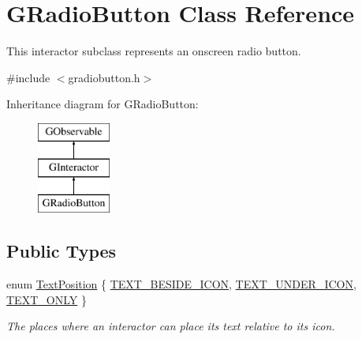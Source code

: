 \hypertarget{classsgl_1_1GRadioButton}{}\section{G\+Radio\+Button Class Reference}
\label{classsgl_1_1GRadioButton}


This interactor subclass represents an onscreen radio button.  




{\ttfamily \#include $<$gradiobutton.\+h$>$}

Inheritance diagram for G\+Radio\+Button\+:\begin{figure}[H]
\begin{center}
\leavevmode
\includegraphics[height=3.000000cm]{classsgl_1_1GRadioButton}
\end{center}
\end{figure}
\subsection*{Public Types}
\begin{DoxyCompactItemize}
\item 
enum \mbox{\hyperlink{classsgl_1_1GInteractor_a8e0d441725a81d2bbdebbea09078260e}{Text\+Position}} \{ \mbox{\hyperlink{classsgl_1_1GInteractor_a8e0d441725a81d2bbdebbea09078260ea4cd6f2e7d5a08d6f4dc052df2358f774}{T\+E\+X\+T\+\_\+\+B\+E\+S\+I\+D\+E\+\_\+\+I\+C\+ON}}, 
\mbox{\hyperlink{classsgl_1_1GInteractor_a8e0d441725a81d2bbdebbea09078260eaa88490f63d8de68d44c83bdb2ecde3b3}{T\+E\+X\+T\+\_\+\+U\+N\+D\+E\+R\+\_\+\+I\+C\+ON}}, 
\mbox{\hyperlink{classsgl_1_1GInteractor_a8e0d441725a81d2bbdebbea09078260ea39a6f388a30ac4fefb6eb13e846bc9f2}{T\+E\+X\+T\+\_\+\+O\+N\+LY}}
 \}
\begin{DoxyCompactList}\small\item\em The places where an interactor can place its text relative to its icon. \end{DoxyCompactList}\end{DoxyCompactItemize}
